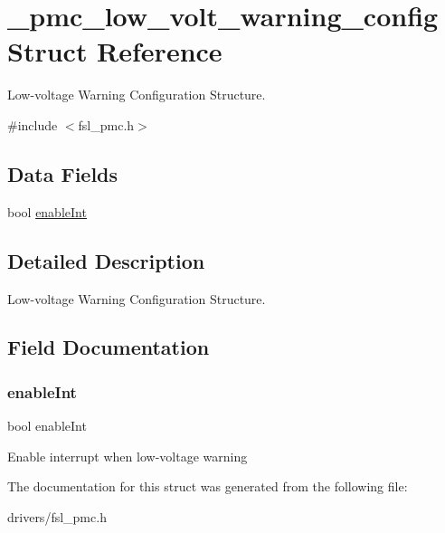 \hypertarget{struct__pmc__low__volt__warning__config}{}\section{\+\_\+pmc\+\_\+low\+\_\+volt\+\_\+warning\+\_\+config Struct Reference}
\label{struct__pmc__low__volt__warning__config}


Low-\/voltage Warning Configuration Structure.  




{\ttfamily \#include $<$fsl\+\_\+pmc.\+h$>$}

\subsection*{Data Fields}
\begin{DoxyCompactItemize}
\item 
bool \mbox{\hyperlink{struct__pmc__low__volt__warning__config_a7524eb6241d1b2490fce40576fa213f1}{enable\+Int}}
\end{DoxyCompactItemize}


\subsection{Detailed Description}
Low-\/voltage Warning Configuration Structure. 

\subsection{Field Documentation}
\mbox{\label{struct__pmc__low__volt__warning__config_a7524eb6241d1b2490fce40576fa213f1}} 
\subsubsection{\texorpdfstring{enableInt}{enableInt}}
{\footnotesize\ttfamily bool enable\+Int}

Enable interrupt when low-\/voltage warning 

The documentation for this struct was generated from the following file\+:\begin{DoxyCompactItemize}
\item 
drivers/fsl\+\_\+pmc.\+h\end{DoxyCompactItemize}
